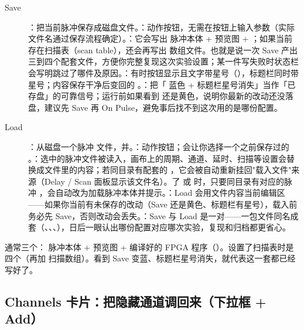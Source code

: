 \documentclass[11pt,oneside,openany]{book}
\begin{document}
\begin{description}
\item[Save] ：把当前脉冲保存成磁盘文件。：动作按钮，无需在按钮上输入参数（实际文件名通过保存流程确定）。：它会写出  脉冲本体 +  预览图 + ；如果当前存在扫描表（scan table），还会再写出  数组文件。也就是说一次 Save 产出三到四个配套文件，方便你完整复现这次实验设置；某一件写失败时状态栏会写明跳过了哪件及原因。：有时按钮显示且文字带星号（），标题栏同时带星号；内容保存干净后变回的 。：把「 蓝色 + 标题栏星号消失」当作「已存盘」的可靠信号；运行前如果看到  还是黄色，说明你最新的改动还没落盘，建议先 Save 再 On Pulse，避免事后找不到这次用的是哪份配置。

\item[Load] ：从磁盘一个脉冲  文件，并。：动作按钮；会让你选择一个之前保存过的 。：选中的脉冲文件被读入，画布上的周期、通道、延时、扫描等设置会替换成文件里的内容；若同目录有配套的 ，它会被自动重新挂回"载入文件"来源（Delay / Scan 面板显示该文件名）。了  或  时，只要同目录有对应的脉冲 ，会自动改为加载脉冲本体并提示。：Load 会用文件内容当前编辑区——如果你当前有未保存的改动（Save 还是黄色、标题栏有星号），载入前务必先 Save，否则改动会丢失。：Save 与 Load 是一对——一包文件同名成套（、、、），日后一眼认出哪份配置对应哪次实验，复现和归档都更省心。
\end{description}

\begin{notebox}
通常三个： 脉冲本体 +  预览图 +  编译好的 FPGA 程序（）。设置了扫描表时是四个（再加  扫描数组）。看到 Save 变蓝、标题栏星号消失，就代表这一套都已经写好了。
\end{notebox}

\subsection{Channels 卡片：把隐藏通道调回来（下拉框 + Add）}
\end{document}
